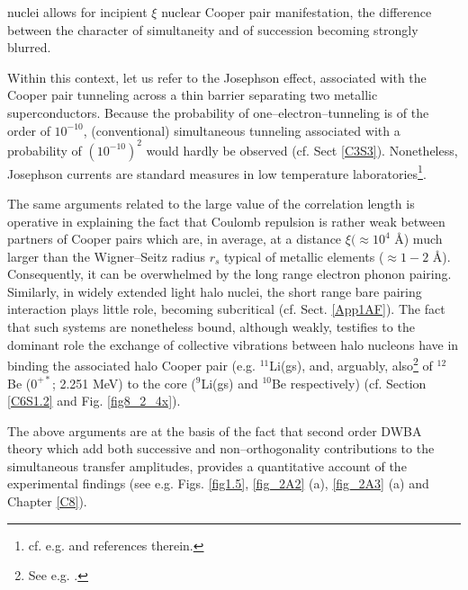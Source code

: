 nuclei allows for incipient $\xi$ nuclear Cooper pair manifestation, the difference between the character of simultaneity and of succession becoming strongly blurred.



Within this context, let us refer to the Josephson effect, associated with the Cooper pair tunneling across a thin barrier separating two metallic superconductors. Because the probability of one--electron--tunneling is of the order of $10^{-10}$, (conventional) simultaneous tunneling associated with a probability of $(10^{-10})^2$ would hardly be observed (cf. Sect \ref{C3S3}). Nonetheless, Josephson currents are standard measures in low temperature laboratories\footnote{cf. e.g. \cite{Rogalla:12} and references therein.}.


The same arguments related  to the large value of the correlation length is operative in explaining the fact that Coulomb repulsion is rather weak between partners of Cooper pairs which are, in average, at a distance $\xi (\approx 10^{4}$ \AA{}) much larger than the Wigner--Seitz radius $r_s$ typical of metallic elements ($\approx 1-2$ \AA{}). Consequently, it can be overwhelmed by the long range electron phonon pairing. Similarly, in widely extended light halo nuclei, the short range bare pairing interaction plays little role, becoming subcritical (cf. Sect. \ref{App1AF}). The fact that such systems are nonetheless bound, although weakly, testifies to the dominant role the exchange of collective vibrations between halo nucleons have in binding the associated halo Cooper pair (e.g. $^{11}$Li(gs), and, arguably, also\footnote{See e.g. \cite{Johansen:13}.} of $^{12}$Be ($0^{+*}$; 2.251 MeV) to the core ($^{9}$Li(gs) and $^{10}$Be respectively) (cf. Section \ref{C6S1.2} and Fig. \ref{fig8_2_4x}).


The above arguments are at the basis of the fact that second order DWBA theory which add both successive and non--orthogonality contributions to the simultaneous transfer amplitudes, provides a quantitative account of the experimental findings (see e.g. Figs. \ref{fig1.5}, \ref{fig_2A2} (a), \ref{fig_2A3} (a) and Chapter  \ref{C8}).

